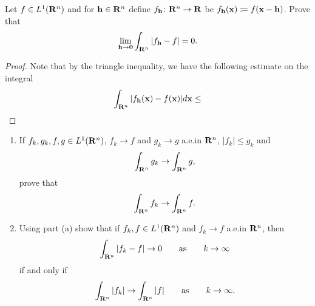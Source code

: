 \begin{problem}
Let $f\in L^1(\mathbf{R}^n)$ and for $\mathbf{h}\in\mathbf{R}^n$ define
$f_{\mathbf{h}}\colon\mathbf{R}^n\to\mathbf{R}$ be $f_{\mathbf{h}}(\mathbf{x})\coloneqq
f(\mathbf{x}-\mathbf{h})$. Prove that
\[
\lim_{\mathbf{h}\to\mathbf{0}}\int_{\mathbf{R}^n}\left|f_{\mathbf{h}}-f\right|=0.
\]
\end{problem}
\begin{proof}
Note that by the triangle inequality, we have the following estimate on the
integral
\begin{equation}
\label{eq:minokwski-estimate-6}
\int_{\mathbf{R}^n}|f_{\mathbf{h}}(\mathbf{x})-f(\mathbf{x})| d \mathbf{x}\leq
\end{equation}

\end{proof}

\begin{problem}
\begin{enumerate}[label=(\alph*)]
\item If $f_k,g_k,f,g\in L^1(\mathbf{R}^n)$, $f_k\to f$ and $g_k\to g$ a.e.\@ in
  $\mathbf{R}^n$, $|f_k|\leq g_k$ and
\[
\int_{\mathbf{R}^n}g_k\to\int_{\mathbf{R}^n}g,
\]
prove that
\[
\int_{\mathbf{R}^n} f_k\to\int_{\mathbf{R}^n}f.
\]
\item Using part (a) show that if $f_k,f\in L^1(\mathbf{R}^n)$ and $f_k\to f$
  a.e.\@ in $\mathbf{R}^n$, then
\[
\int_{\mathbf{R}^n}|f_k-f|\to 0\qquad\text{as}\qquad k\to\infty
\]
if and only if
\[
\int_{\mathbf{R}^n}|f_k|\to\int_{\mathbf{R}^n}|f|\qquad\text{as}\qquad k\to\infty.
\]
\end{enumerate}
\end{problem}
